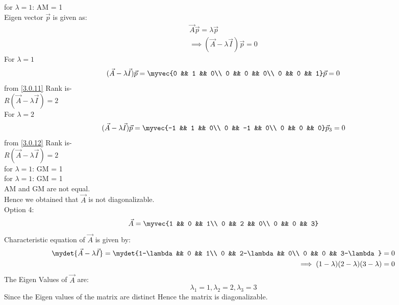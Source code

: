\documentclass[journal,12pt,twocolumn]{IEEEtran}
\begin{document}
for $\lambda = 1$: AM = 1\\
Eigen vector $\vec{p}$ is given as:
\begin{equation} \label{3.0.10}
\begin{split}
\vec{A}\vec{p} = \lambda\vec{p}\\
\implies (\vec{A} - \lambda \vec{I})\vec{p} = 0
\end{split}
\end{equation}
For $\lambda = 1$
\begin{equation}\label{3.0.11}
(\vec{A} - \lambda \vec{I})\vec{p} = \myvec{0 && 1 && 0\\ 0 && 0 && 0\\ 0 && 0 && 1}\vec{p} = 0\\ 
\end{equation}
from \eqref{3.0.11} Rank is-\\
$R(\vec{A} - \lambda \vec{I}) = 2$\\
For $\lambda = 2$
\begin{equation}\label{3.0.12}
(\vec{A} - \lambda \vec{I})\vec{p} = \myvec{-1 && 1 && 0\\ 0 && -1 && 0\\ 0 && 0 && 0}\vec{p}_3 = 0
\end{equation}
from \eqref{3.0.12} Rank is-\\
$R(\vec{A} - \lambda \vec{I}) = 2$\\
for $\lambda = 1$: GM = 1\\
for $\lambda = 1$: GM = 1\\
AM and GM are not equal.\\
Hence we obtained that $\vec{A}$ is not diagonalizable.\\
Option 4:
\begin{equation*}
\vec{A} = \myvec{1 && 0 && 1\\ 0 && 2 && 0\\ 0 && 0 && 3}
\end{equation*}
Characteristic equation of $\vec{A}$ is given by:
\begin{equation} \label{3.0.13}
\begin{split}
\mydet{\vec{A}-\lambda \vec{I}}=\mydet{1-\lambda && 0 && 1\\ 0 && 2-\lambda && 0\\ 0 && 0 && 3-\lambda} = 0\\
\implies (1-\lambda)(2-\lambda)(3-\lambda) = 0
\end{split}
\end{equation}
The Eigen Values of $\vec{A}$ are:
\begin{equation} \label{3.0.14}
\lambda_1 = 1, \lambda_2 = 2, \lambda_3 = 3
\end{equation}
Since the Eigen values of the matrix are distinct Hence the matrix is diagonalizable.
\end{document}
